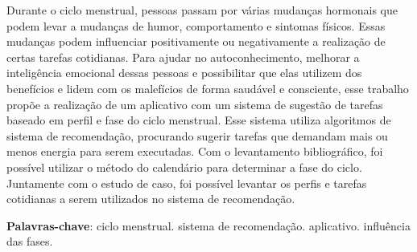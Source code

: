 \begin{resumo}

Durante o ciclo menstrual, pessoas passam por várias mudanças hormonais que podem levar a 
mudanças de humor, comportamento e sintomas físicos. Essas mudanças podem influenciar  
positivamente ou negativamente a realização de certas tarefas cotidianas. Para 
ajudar no autoconhecimento, melhorar a inteligência emocional 
dessas pessoas e possibilitar que elas utilizem dos benefícios e lidem com os 
malefícios 
de forma saudável e consciente, esse trabalho propõe a 
realização de um aplicativo com um sistema de sugestão de tarefas baseado em 
perfil e fase do ciclo menstrual. Esse sistema utiliza algoritmos de sistema 
de recomendação, procurando sugerir tarefas 
que demandam mais ou menos energia para serem executadas. Com o levantamento bibliográfico, 
foi possível utilizar o método do calendário para determinar a fase do ciclo. Juntamente com o 
estudo de caso, foi possível levantar os perfis e tarefas cotidianas a serem utilizados no sistema de 
recomendação.

 \vspace{\onelineskip}
    
 \noindent
 \textbf{Palavras-chave}: ciclo menstrual. sistema de recomendação. aplicativo. influência das fases.
\end{resumo}
